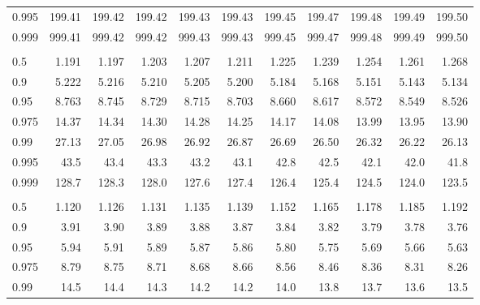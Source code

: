 \documentclass[
]{article}
\begin{document}
\begin{table}[H]
\begin{tabular}{lrrrrrrrrrr}
\hspace{1em}0.995 & 199.41 & 199.42 & 199.42 & 199.43 & 199.43 & 199.45 & 199.47 & 199.48 & 199.49 & 199.50\\
\hspace{1em}0.999 & 999.41 & 999.42 & 999.42 & 999.43 & 999.43 & 999.45 & 999.47 & 999.48 & 999.49 & 999.50\\
\addlinespace[0.3em]
\multicolumn{11}{l}{\textbf{$k_2=3$}}\\
\hspace{1em}0.5 & 1.191 & 1.197 & 1.203 & 1.207 & 1.211 & 1.225 & 1.239 & 1.254 & 1.261 & 1.268\\
\hspace{1em}0.9 & 5.222 & 5.216 & 5.210 & 5.205 & 5.200 & 5.184 & 5.168 & 5.151 & 5.143 & 5.134\\
\hspace{1em}0.95 & 8.763 & 8.745 & 8.729 & 8.715 & 8.703 & 8.660 & 8.617 & 8.572 & 8.549 & 8.526\\
\hspace{1em}0.975 & 14.37 & 14.34 & 14.30 & 14.28 & 14.25 & 14.17 & 14.08 & 13.99 & 13.95 & 13.90\\
\hspace{1em}0.99 & 27.13 & 27.05 & 26.98 & 26.92 & 26.87 & 26.69 & 26.50 & 26.32 & 26.22 & 26.13\\
\hspace{1em}0.995 & 43.5 & 43.4 & 43.3 & 43.2 & 43.1 & 42.8 & 42.5 & 42.1 & 42.0 & 41.8\\
\hspace{1em}0.999 & 128.7 & 128.3 & 128.0 & 127.6 & 127.4 & 126.4 & 125.4 & 124.5 & 124.0 & 123.5\\
\addlinespace[0.3em]
\multicolumn{11}{l}{\textbf{$k_2=4$}}\\
\hspace{1em}0.5 & 1.120 & 1.126 & 1.131 & 1.135 & 1.139 & 1.152 & 1.165 & 1.178 & 1.185 & 1.192\\
\hspace{1em}0.9 & 3.91 & 3.90 & 3.89 & 3.88 & 3.87 & 3.84 & 3.82 & 3.79 & 3.78 & 3.76\\
\hspace{1em}0.95 & 5.94 & 5.91 & 5.89 & 5.87 & 5.86 & 5.80 & 5.75 & 5.69 & 5.66 & 5.63\\
\hspace{1em}0.975 & 8.79 & 8.75 & 8.71 & 8.68 & 8.66 & 8.56 & 8.46 & 8.36 & 8.31 & 8.26\\
\hspace{1em}0.99 & 14.5 & 14.4 & 14.3 & 14.2 & 14.2 & 14.0 & 13.8 & 13.7 & 13.6 & 13.5\\

\end{tabular}
\end{table}
\end{document}
